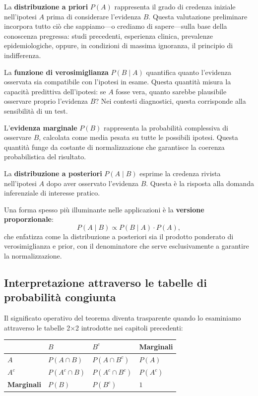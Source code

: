 \documentclass[
  letterpaper,
  DIV=11,
  numbers=noendperiod,
  oneside]{scrreprt}
\theoremstyle{definition}
\theoremstyle{plain}
\theoremstyle{definition}
\theoremstyle{remark}
\begin{document}
La \textbf{distribuzione a priori} \(P(A)\) rappresenta il grado di
credenza iniziale nell'ipotesi \(A\) prima di considerare l'evidenza
\(B\). Questa valutazione preliminare incorpora tutto ciò che
sappiamo---o crediamo di sapere---sulla base della conoscenza pregressa:
studi precedenti, esperienza clinica, prevalenze epidemiologiche,
oppure, in condizioni di massima ignoranza, il principio di
indifferenza.

La \textbf{funzione di verosimiglianza} \(P(B \mid A)\) quantifica
quanto l'evidenza osservata sia compatibile con l'ipotesi in esame.
Questa quantità misura la capacità predittiva dell'ipotesi: se \(A\)
fosse vera, quanto sarebbe plausibile osservare proprio l'evidenza
\(B\)? Nei contesti diagnostici, questa corrisponde alla sensibilità di
un test.

L'\textbf{evidenza marginale} \(P(B)\) rappresenta la probabilità
complessiva di osservare \(B\), calcolata come media pesata su tutte le
possibili ipotesi. Questa quantità funge da costante di normalizzazione
che garantisce la coerenza probabilistica del risultato.

La \textbf{distribuzione a posteriori} \(P(A \mid B)\) esprime la
credenza rivista nell'ipotesi \(A\) dopo aver osservato l'evidenza
\(B\). Questa è la risposta alla domanda inferenziale di interesse
pratico.

Una forma spesso più illuminante nelle applicazioni è la
\textbf{versione proporzionale}: \[
P(A \mid B) \propto P(B \mid A) \cdot P(A),
\] che enfatizza come la distribuzione a posteriori sia il prodotto
ponderato di verosimiglianza e prior, con il denominatore che serve
esclusivamente a garantire la normalizzazione.

\subsection{Interpretazione attraverso le tabelle di probabilità
congiunta}\label{interpretazione-attraverso-le-tabelle-di-probabilituxe0-congiunta}

Il significato operativo del teorema diventa trasparente quando lo
esaminiamo attraverso le tabelle 2×2 introdotte nei capitoli precedenti:

\begin{longtable}[]{@{}llll@{}}
\toprule\noalign{}
& \(B\) & \(B^c\) & Marginali \\
\midrule\noalign{}
\endhead
\bottomrule\noalign{}
\endlastfoot
\(A\) & \(P(A \cap B)\) & \(P(A \cap B^c)\) & \(P(A)\) \\
\(A^c\) & \(P(A^c \cap B)\) & \(P(A^c \cap B^c)\) & \(P(A^c)\) \\
\textbf{Marginali} & \(P(B)\) & \(P(B^c)\) & \(1\) \\
\end{longtable}
\end{document}

